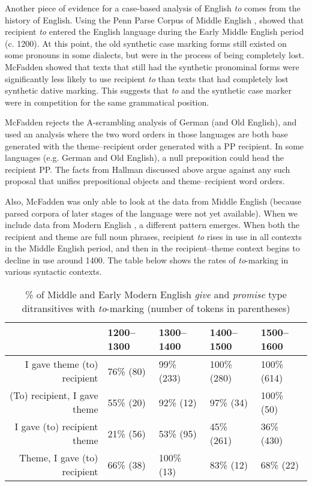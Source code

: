 Another piece of evidence for a case-based analysis of English \textit{to} comes from the history of English. Using the Penn Parse Corpus of Middle English \citep{Kroch.2000}, \cite{McFadden.2002} showed that recipient \textit{to} entered the English language during the Early Middle English period (c. 1200). At this point, the old synthetic case marking forms still existed on some pronouns in some dialects, but were in the process of being completely lost. McFadden showed that texts that still had the synthetic pronominal forms were significantly less likely to use recipient \textit{to} than texts that had completely lost synthetic dative marking. This suggests that \textit{to} and the synthetic case marker were in competition for the same grammatical position.

McFadden rejects the A-scrambling analysis of German (and Old English), and used an analysis where the two word orders in those languages are both base generated with the theme--recipient order generated with a PP recipient. In some languages (e.g. German and Old English), a null preposition could head the recipient PP. The facts from Hallman discussed above argue against any such proposal that unifies prepositional objects and theme--recipient word orders.

Also, McFadden was only able to look at the data from Middle English (because parsed corpora of later stages of the language were not yet available). When we include data from Modern English \citep{Kroch.2004,Kroch.2010,Taylor.2006}, a different pattern emerges. When both the recipient and theme are full noun phrases, recipient \textit{to}  rises in use in all contexts in the Middle English period, and then in the recipient--theme context begins to decline in use around 1400. The table below shows the rates of \textit{to}-marking in various syntactic contexts.


\begin{table}[ht]
\centering
\begin{tabular}{rllll}
  \hline
 & 1200--1300 & 1300--1400 & 1400--1500 & 1500--1600 \\ 
  \hline
I gave theme (to) recipient & 76\% (80) & 99\% (233) & 100\% (280) & 100\% (614) \\ 
  (To) recipient, I gave theme & 55\% (20) & 92\% (12) & 97\% (34) & 100\% (50) \\ 
  I gave (to) recipient theme & 21\% (56) & 53\% (95) & 45\% (261) & 36\% (430) \\ 
  Theme, I gave (to) recipient & 66\% (38) & 100\% (13) & 83\% (12) & 68\% (22) \\ 
   \hline
\end{tabular}
\caption{\% of Middle and Early Modern English \textit{give} and \textit{promise} type ditransitives with \textit{to}-marking (number of tokens in parentheses)} 
\label{tab:britto}
\end{table}



